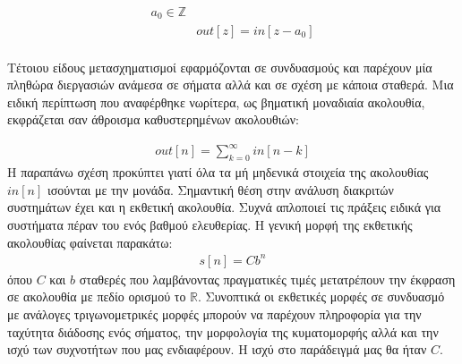 \documentclass[breaklines=true, 12pt]{article}
\begin{document}
\begin{equation}
\begin{align}
a_{0} \in \mathbb{Z} \\
&out[z] = in[z-a_{0}] \\
\end{align}
\end{equation}

Τέτοιου είδους μετασχηματισμοί εφαρμόζονται σε συνδυασμούς και παρέχουν μία
πληθώρα διεργασιών ανάμεσα σε σήματα αλλά και σε σχέση με κάποια σταθερά.
Μια ειδική περίπτωση που αναφέρθηκε νωρίτερα, ως βηματική μοναδιαία
ακολουθία, εκφράζεται σαν άθροισμα καθυστερημένων ακολουθιών:

\begin{equation}
\begin{align}
out[n] = \sum_{k=0}^{\infty} in[n-k]
\end{align}
\end{equation}
Η παραπάνω σχέση προκύπτει γιατί όλα τα μή μηδενικά στοιχεία της ακολουθίας
\(in[n]\) ισούνται με την μονάδα. Σημαντική θέση στην ανάλυση διακριτών συστημάτων
έχει και η εκθετική ακολουθία. Συχνά απλοποιεί τις πράξεις ειδικά για
συστήματα πέραν του ενός βαθμού ελευθερίας. Η γενική μορφή της εκθετικής
ακολουθίας φαίνεται παρακάτω:
\begin{equation}
\begin{align}
s[n] = Cb^{n}
\end{align}
\end{equation}
όπου \(C\) και \(b\) σταθερές που λαμβάνοντας πραγματικές τιμές
μετατρέπουν την έκφραση σε ακολουθία με πεδίο ορισμού το \(\mathbb{R}\).
Συνοπτικά οι εκθετικές μορφές σε συνδυασμό με ανάλογες τριγωνομετρικές
μορφές μπορούν να παρέχουν πληροφορία για την ταχύτητα διάδοσης ενός
σήματος, την μορφολογία της κυματομορφής αλλά και την ισχύ των συχνοτήτων
που μας ενδιαφέρουν. Η ισχύ στο παράδειγμά μας θα ήταν \(C\).
\end{document}
